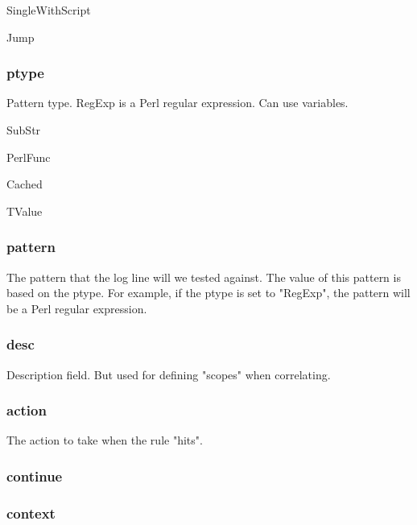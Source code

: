 SingleWithScript

Jump

\subsubsection{ptype}
Pattern type. RegExp is a Perl regular expression. Can use variables.

SubStr

PerlFunc

Cached

TValue

\subsubsection{pattern}
The pattern that the log line will we tested against. The value of this pattern is based on the ptype. For example, if the ptype is set to "RegExp", the pattern will be a Perl regular expression.

\subsubsection{desc}
Description field. But used for defining "scopes" when correlating.

\subsubsection{action}
The action to take when the rule "hits".

\subsubsection{continue}

\subsubsection{context}
